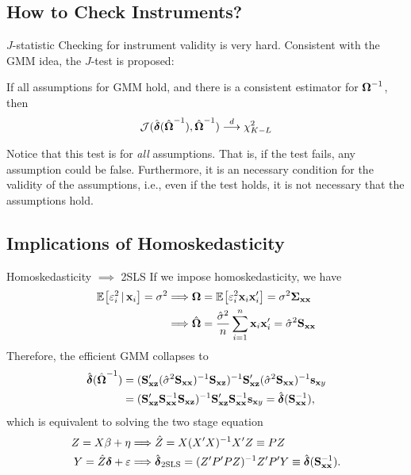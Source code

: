 \documentclass{beamer}
\begin{document}
\subsection{How to Check Instruments?}

\begin{frame}{$J$-statistic}
	Checking for instrument validity is very hard.
	Consistent with the GMM idea, the $J$-test is proposed:
	\begin{theorem}
		If all assumptions for GMM hold,
		and there is a consistent estimator for $\boldsymbol{\Omega}^{-1}$,
		then
		\begin{align*}
			\mathcal{J}(\hat{\boldsymbol{\delta}}(\hat{\boldsymbol{\Omega}}^{-1}),\hat{\boldsymbol{\Omega}}^{-1})
			\overset{d}{\longrightarrow}\chi^2_{K-L}
		\end{align*}
	\end{theorem}
	Notice that this test is for \emph{all} assumptions.
	That is, if the test fails, any assumption could be false.
	Furthermore, it is an necessary condition for the validity of the assumptions,
	i.e., even if the test holds, it is not necessary that the assumptions hold.
\end{frame}

\subsection{Implications of Homoskedasticity}

\begin{frame}{Homoskedasticity $\implies$ 2SLS}
	If we impose homoskedasticity, we have
	\begin{align*}
		\operatorname{\mathbb{E}}_{}\!\left[\varepsilon_i^2\,|\,\mathbf{x}_i\right] = \sigma^2
		&\Longrightarrow \boldsymbol{\Omega} = \operatorname{\mathbb{E}}_{}\!\left[\varepsilon_i^2\mathbf{x}_i\mathbf{x}_i'\right] = \sigma^2\boldsymbol{\Sigma}_{\mathbf{x}\mathbf{x}} \\
		&\Longrightarrow \hat{\boldsymbol{\Omega}} = \frac{\hat{\sigma}^2}{n}\sum_{i=1}^{n}\mathbf{x}_i\mathbf{x}_i' = \hat{\sigma}^2\mathbf{S}_{\mathbf{x}\mathbf{x}}
	\end{align*}
	Therefore, the efficient GMM collapses to
	\begin{align*}
		\hat{\boldsymbol{\delta}}(\hat{\boldsymbol{\Omega}}^{-1})
		&= (\mathbf{S}_{\mathbf{x}\mathbf{z}}'(\hat{\sigma}^2\mathbf{S}_{\mathbf{x}\mathbf{x}})^{-1}\mathbf{S}_{\mathbf{x}\mathbf{z}})^{-1}\mathbf{S}_{\mathbf{x}\mathbf{z}}'
		(\hat{\sigma}^2\mathbf{S}_{\mathbf{x}\mathbf{x}})^{-1}\mathbf{s}_{\mathbf{x} y} \\
		&= (\mathbf{S}_{\mathbf{x}\mathbf{z}}'\mathbf{S}_{\mathbf{x}\mathbf{x}}^{-1}\mathbf{S}_{\mathbf{x}\mathbf{z}})^{-1}\mathbf{S}_{\mathbf{x}\mathbf{z}}'\mathbf{S}_{\mathbf{x}\mathbf{x}}^{-1}\mathbf{s}_{\mathbf{x} y}
		= \hat{\boldsymbol{\delta}}(\mathbf{S}_{\mathbf{x}\mathbf{x}}^{-1}),
	\end{align*}
	which is equivalent to solving the two stage equation
	\begin{align}
		Z = X\beta + \eta &\Longrightarrow \hat{Z} = X(X'X)^{-1} X'Z \equiv PZ \\
		Y = \hat{Z}\boldsymbol{\delta} + \varepsilon &\Longrightarrow \hat{\boldsymbol{\delta}}_{\text{2SLS}}
			= (Z'P'PZ)^{-1}{Z'P'Y}
			\equiv \hat{\boldsymbol{\delta}}(\mathbf{S}_{\mathbf{x}\mathbf{x}}^{-1}).
	\end{align}
\end{frame}
\end{document}
